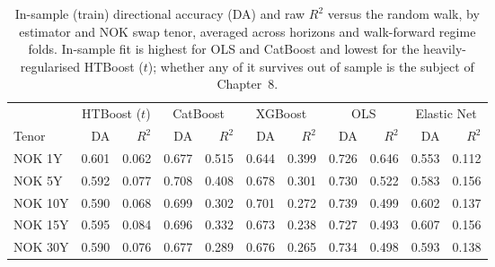 \begin{table}[htbp]
\centering
\caption{In-sample (train) directional accuracy (DA) and raw $R^2$ versus the random walk, by estimator and NOK swap tenor, averaged across horizons and walk-forward regime folds. In-sample fit is highest for OLS and CatBoost and lowest for the heavily-regularised HTBoost ($t$); whether any of it survives out of sample is the subject of Chapter~8.}
\label{tab:is_estimators}
\footnotesize
\begin{tabular}{lrrrrrrrrrr}
\toprule
\multicolumn{1}{c}{} & \multicolumn{2}{c}{HTBoost ($t$)} & \multicolumn{2}{c}{CatBoost} & \multicolumn{2}{c}{XGBoost} & \multicolumn{2}{c}{OLS} & \multicolumn{2}{c}{Elastic Net} \\
\cmidrule(lr){2-3} \cmidrule(lr){4-5} \cmidrule(lr){6-7} \cmidrule(lr){8-9} \cmidrule(lr){10-11}
Tenor & DA & $R^2$ & DA & $R^2$ & DA & $R^2$ & DA & $R^2$ & DA & $R^2$ \\
\midrule
NOK 1Y & 0.601 & 0.062 & 0.677 & 0.515 & 0.644 & 0.399 & 0.726 & 0.646 & 0.553 & 0.112 \\
NOK 5Y & 0.592 & 0.077 & 0.708 & 0.408 & 0.678 & 0.301 & 0.730 & 0.522 & 0.583 & 0.156 \\
NOK 10Y & 0.590 & 0.068 & 0.699 & 0.302 & 0.701 & 0.272 & 0.739 & 0.499 & 0.602 & 0.137 \\
NOK 15Y & 0.595 & 0.084 & 0.696 & 0.332 & 0.673 & 0.238 & 0.727 & 0.493 & 0.607 & 0.156 \\
NOK 30Y & 0.590 & 0.076 & 0.677 & 0.289 & 0.676 & 0.265 & 0.734 & 0.498 & 0.593 & 0.138 \\
\bottomrule
\end{tabular}
\end{table}
